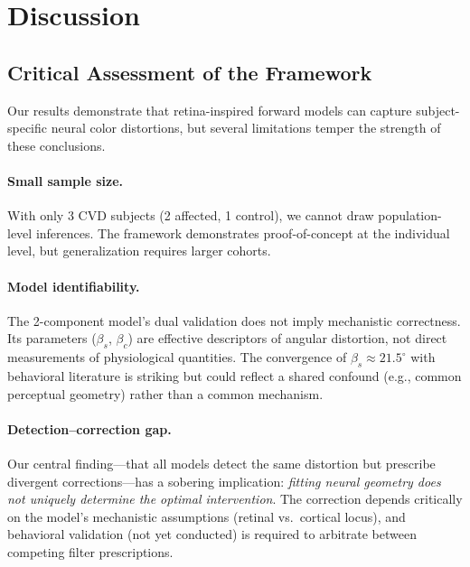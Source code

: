 \documentclass{article}
\begin{document}
\section{Discussion}
\label{sec:discussion}

\subsection{Critical Assessment of the Framework}

Our results demonstrate that retina-inspired forward models can capture subject-specific neural color distortions, but several limitations temper the strength of these conclusions.

\paragraph{Small sample size.}
With only 3 CVD subjects (2 affected, 1 control), we cannot draw population-level inferences.
The framework demonstrates proof-of-concept at the individual level, but generalization requires larger cohorts.

\paragraph{Model identifiability.}
The 2-component model's dual validation does not imply mechanistic correctness.
Its parameters ($\beta_s$, $\beta_c$) are effective descriptors of angular distortion, not direct measurements of physiological quantities.
The convergence of $\beta_s \approx 21.5^\circ$ with behavioral literature \cite{placeholder_emery2021} is striking but could reflect a shared confound (e.g., common perceptual geometry) rather than a common mechanism.

\paragraph{Detection--correction gap.}
Our central finding---that all models detect the same distortion but prescribe divergent corrections---has a sobering implication: \emph{fitting neural geometry does not uniquely determine the optimal intervention}.
The correction depends critically on the model's mechanistic assumptions (retinal vs.\ cortical locus), and behavioral validation (not yet conducted) is required to arbitrate between competing filter prescriptions.
\end{document}
